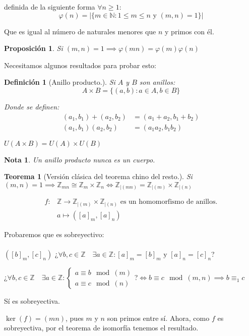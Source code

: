 \documentclass[11pt, a4paper, titlepage]{article}
\makeatletter
\newif\IfInSansMode
\let\oldsf\sffamily
\renewcommand*{\sffamily}{\oldsf\mathversion{sans}\InSansModetrue}
\let\oldnorm\normalfont
\renewcommand*{\normalfont}{\oldnorm\InSansModefalse\mathversion{normal}}
\renewenvironment{proof}[1][\proofname] {\vspace{-15pt}\par\pushQED{\qed}\normalfont\topsep6\p@\@plus6\p@\relax\trivlist\item[\hskip\labelsep\it#1\@addpunct{.}]\ignorespaces}{\popQED\endtrivlist\@endpefalse}
\renewenvironment{proof}[1][\proofname] {\par\pushQED{\qed}\normalfont\topsep6\p@\@plus6\p@\relax\trivlist\item[\hskip\labelsep\itshape\sffamily#1\@addpunct{.}]\ignorespaces}{\popQED\endtrivlist\@endpefalse}
\theoremstyle{theorem-style}
\newtheorem{nth}{Teorema}[section]
\newtheorem{nprop}{Proposición}[section]
\theoremstyle{definition-style}
\newtheorem{ndef}{Definición}[section]
\theoremstyle{remark-style}
\newtheorem*{nota}{Nota}
\theoremstyle{example-style}
\makeatother
\begin{document}
definida de la siguiente forma $\forall n\ge 1$:
\[
  \varphi(n) = |\{m\in \mathbb{N} : 1\le m \le n \text{ y } (m,n)=1\}|
\]

Que es igual al número de naturales menores que $n$ y primos con él.

\begin{nprop}
  Si $(m,n) = 1 \implies \varphi(mn) = \varphi(m)\varphi(n)$
\end{nprop}

Necesitamos algunos resultados para probar esto:

\begin{ndef}[Anillo producto.]
Si $A$ y $B$ son anillos:
\[
  A\times B = \{(a,b) : a\in A, b\in B\}
\]

Donde se definen:
\begin{align*}
  (a_1,b_1)+(a_2,b_2) &= (a_1+a_2, b_1+b_2)\\
  (a_1,b_1)(a_2,b_2) &= (a_1a_2, b_1b_2)
\end{align*}

$U(A\times B) = U(A)\times U(B)$

\end{ndef}

\begin{nota} Un anillo producto nunca es un cuerpo.

\end{nota}

\begin{nth}[Versión clásica del teorema chino del resto.]
Si $(m,n)=1 \implies \mathbb{Z}_{mn} \cong \mathbb{Z}_m \times \mathbb{Z}_n \iff \mathbb{Z}_{|(mn)} = \mathbb{Z}_{|(m)} \times \mathbb{Z}_{|(n)}$
\end{nth}

\begin{proof}
\begin{align*}
f:& \mathbb{Z} \longrightarrow \mathbb{Z}_{|(m)}\times \mathbb{Z}_{|(n)}\text{ es un homomorfismo de anillos.}\\
& a \longmapsto ([a]_m, [a]_n)
\end{align*}

Probaremos que es sobreyectivo:\\\\
$([b]_m,[c]_n)$ ¿$\forall b,c \in \mathbb{Z}\quad \exists a \in \mathbb{Z} : [a]_m = [b]_m \text{ y } [a]_n = [c]_n$?

¿$\forall b,c \in \mathbb{Z}\quad \exists a \in \mathbb{Z} : \begin{cases}
  a \equiv b \mod(m)\\
  a \equiv c \mod(n)
\end{cases}$?$ \iff b \equiv c \mod(m,n) \implies b \equiv_1 c$

Sí es sobreyectiva.

$\ker(f) = (mn)$, pues $m$ y $n$ son primos entre sí. Ahora, como $f$ es sobreyectiva, por el teorema de isomorfía tenemos el resultado.
\end{proof}
\end{document}
